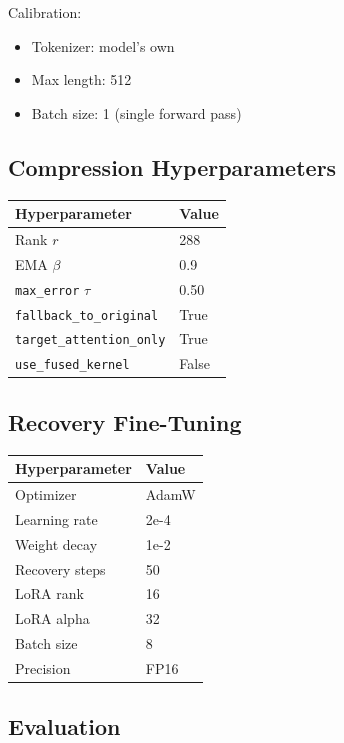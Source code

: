 Calibration:
\begin{itemize}
\item Tokenizer: model's own
\item Max length: 512
\item Batch size: 1 (single forward pass)

\end{itemize}
\subsection{Compression Hyperparameters}

\begin{table}[H]
\centering
\small
\begin{tabular}{ll}
\toprule
\textbf{Hyperparameter} & \textbf{Value} \\
\midrule
Rank $r$ & 288 \\
EMA $\beta$ & 0.9 \\
\texttt{max\_error} $\tau$ & 0.50 \\
\texttt{fallback\_to\_original} & True \\
\texttt{target\_attention\_only} & True \\
\texttt{use\_fused\_kernel} & False \\
\bottomrule
\end{tabular}
\end{table}

\subsection{Recovery Fine-Tuning}

\begin{table}[H]
\centering
\small
\begin{tabular}{ll}
\toprule
\textbf{Hyperparameter} & \textbf{Value} \\
\midrule
Optimizer & AdamW \\
Learning rate & 2e-4 \\
Weight decay & 1e-2 \\
Recovery steps & 50 \\
LoRA rank & 16 \\
LoRA alpha & 32 \\
Batch size & 8 \\
Precision & FP16 \\
\bottomrule
\end{tabular}
\end{table}

\subsection{Evaluation}

